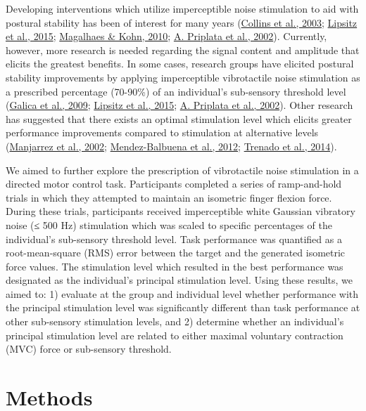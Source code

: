 \documentclass[]{cik}%
\begin{document}
Developing interventions which utilize imperceptible noise stimulation
to aid with postural stability has been of interest for many years
(\protect\hyperlink{ref-Collins2003}{Collins et al., 2003};
\protect\hyperlink{ref-Lipsitz2015}{Lipsitz et al., 2015};
\protect\hyperlink{ref-magalhuxe3es2011}{Magalhaes \& Kohn, 2010};
\protect\hyperlink{ref-Priplata2002}{A. Priplata et al., 2002}).
Currently, however, more research is needed regarding the signal content
and amplitude that elicits the greatest benefits. In some cases,
research groups have elicited postural stability improvements by
applying imperceptible vibrotactile noise stimulation as a prescribed
percentage (70-90\%) of an individual's sub-sensory threshold level
(\protect\hyperlink{ref-Galica2009}{Galica et al., 2009};
\protect\hyperlink{ref-Lipsitz2015}{Lipsitz et al., 2015};
\protect\hyperlink{ref-Priplata2002}{A. Priplata et al., 2002}). Other
research has suggested that there exists an optimal stimulation level
which elicits greater performance improvements compared to stimulation
at alternative levels (\protect\hyperlink{ref-Manjarrez2002}{Manjarrez
et al., 2002};
\protect\hyperlink{ref-Mendez-Balbuena2012}{Mendez-Balbuena et al.,
2012}; \protect\hyperlink{ref-Trenado2014}{Trenado et al., 2014}).

We aimed to further explore the prescription of vibrotactile noise
stimulation in a directed motor control task. Participants completed a
series of ramp-and-hold trials in which they attempted to maintain an
isometric finger flexion force. During these trials, participants
received imperceptible white Gaussian vibratory noise (≤ 500 Hz)
stimulation which was scaled to specific percentages of the individual's
sub-sensory threshold level. Task performance was quantified as a
root-mean-square (RMS) error between the target and the generated
isometric force values. The stimulation level which resulted in the best
performance was designated as the individual's principal stimulation
level. Using these results, we aimed to: 1) evaluate at the group and
individual level whether performance with the principal stimulation
level was significantly different than task performance at other
sub-sensory stimulation levels, and 2) determine whether an individual's
principal stimulation level are related to either maximal voluntary
contraction (MVC) force or sub-sensory threshold.

\newpage

\hypertarget{methods}{%
\section{Methods}\label{methods}}
\end{document}

